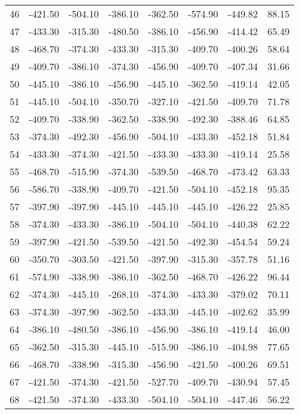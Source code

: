 \begin{longtable}{rrrrrrrr}
46 & -421.50 & -504.10 & -386.10 & -362.50 & -574.90 & -449.82 & 88.15  \\
47 & -433.30 & -315.30 & -480.50 & -386.10 & -456.90 & -414.42 & 65.49  \\
48 & -468.70 & -374.30 & -433.30 & -315.30 & -409.70 & -400.26 & 58.64  \\
49 & -409.70 & -386.10 & -374.30 & -456.90 & -409.70 & -407.34 & 31.66  \\
50 & -445.10 & -386.10 & -456.90 & -445.10 & -362.50 & -419.14 & 42.05  \\
51 & -445.10 & -504.10 & -350.70 & -327.10 & -421.50 & -409.70 & 71.78  \\
52 & -409.70 & -338.90 & -362.50 & -338.90 & -492.30 & -388.46 & 64.85  \\
53 & -374.30 & -492.30 & -456.90 & -504.10 & -433.30 & -452.18 & 51.84  \\
54 & -433.30 & -374.30 & -421.50 & -433.30 & -433.30 & -419.14 & 25.58  \\
55 & -468.70 & -515.90 & -374.30 & -539.50 & -468.70 & -473.42 & 63.33  \\
56 & -586.70 & -338.90 & -409.70 & -421.50 & -504.10 & -452.18 & 95.35  \\
57 & -397.90 & -397.90 & -445.10 & -445.10 & -445.10 & -426.22 & 25.85  \\
58 & -374.30 & -433.30 & -386.10 & -504.10 & -504.10 & -440.38 & 62.22  \\
59 & -397.90 & -421.50 & -539.50 & -421.50 & -492.30 & -454.54 & 59.24  \\
60 & -350.70 & -303.50 & -421.50 & -397.90 & -315.30 & -357.78 & 51.16  \\
61 & -574.90 & -338.90 & -386.10 & -362.50 & -468.70 & -426.22 & 96.44  \\
62 & -374.30 & -445.10 & -268.10 & -374.30 & -433.30 & -379.02 & 70.11  \\
63 & -374.30 & -397.90 & -362.50 & -433.30 & -445.10 & -402.62 & 35.99  \\
64 & -386.10 & -480.50 & -386.10 & -456.90 & -386.10 & -419.14 & 46.00  \\
65 & -362.50 & -315.30 & -445.10 & -515.90 & -386.10 & -404.98 & 77.65  \\
66 & -468.70 & -338.90 & -315.30 & -456.90 & -421.50 & -400.26 & 69.51  \\
67 & -421.50 & -374.30 & -421.50 & -527.70 & -409.70 & -430.94 & 57.45  \\
68 & -421.50 & -374.30 & -433.30 & -504.10 & -504.10 & -447.46 & 56.22  \\

\end{longtable}
